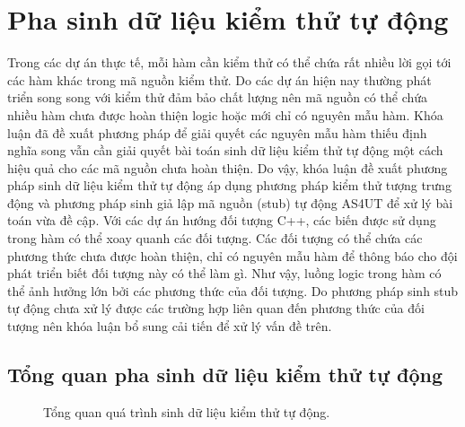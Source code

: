 \section{Pha sinh dữ liệu kiểm thử tự động} \label{sec:autogen}
Trong các dự án thực tế, mỗi hàm cần kiểm thử có thể chứa rất nhiều lời gọi tới các hàm khác trong mã nguồn kiểm thử. Do các dự án hiện nay thường phát triển song song với kiểm thử đảm bảo chất lượng nên mã nguồn có thể chứa nhiều hàm chưa được hoàn thiện logic hoặc mới chỉ có nguyên mẫu hàm. Khóa luận đã đề xuất phương pháp để giải quyết các nguyên mẫu hàm thiếu định nghĩa song vẫn cần giải quyết bài toán sinh dữ liệu kiểm thử tự động một cách hiệu quả cho các mã nguồn chưa hoàn thiện. Do vậy, khóa luận đề xuất phương pháp sinh dữ liệu kiểm thử tự động áp dụng phương pháp kiểm thử tượng trưng động \cite{DART, CUTE, 9953784} và phương pháp sinh giả lập mã nguồn (stub) tự động AS4UT \cite{TUNG2022106821} để xử lý bài toán vừa đề cập. Với các dự án hướng đối tượng C++, các biến được sử dụng trong hàm có thể xoay quanh các đối tượng. Các đối tượng có thể chứa các phương thức chưa được hoàn thiện, chỉ có nguyên mẫu hàm để thông báo cho đội phát triển biết đối tượng này có thể làm gì. Như vậy, luồng logic trong hàm có thể ảnh hưởng lớn bởi các phương thức của đối tượng. Do phương pháp sinh stub tự động chưa xử lý được các trường hợp liên quan đến phương thức của đối tượng nên khóa luận bổ sung cải tiến để xử lý vấn đề trên.

\subsection{Tổng quan pha sinh dữ liệu kiểm thử tự động}

\begin{figure}[hb]
    \centering
    
    \caption{Tổng quan quá trình sinh dữ liệu kiểm thử tự động.}
    \label{fig:autogen-flow}
\end{figure}

